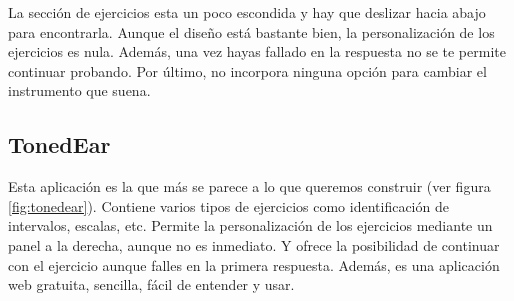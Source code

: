 \documentclass[12pt,twoside,titlepage]{report}
\begin{document}

La sección de ejercicios esta un poco escondida y hay que deslizar hacia abajo para encontrarla. Aunque el diseño está bastante bien, la personalización de los ejercicios es nula. Además, una vez hayas fallado en la respuesta no se te permite continuar probando. Por último, no incorpora ninguna opción para cambiar el instrumento que suena.

\subsection{TonedEar}

Esta aplicación es la que más se parece a lo que queremos construir (ver figura \ref{fig:tonedear}). Contiene varios tipos de ejercicios como identificación de intervalos, escalas, etc. Permite la personalización de los ejercicios mediante un panel a la derecha, aunque no es inmediato. Y ofrece la posibilidad de continuar con el ejercicio aunque falles en la primera respuesta. Además, es una aplicación web gratuita, sencilla, fácil de entender y usar.
\end{document}
